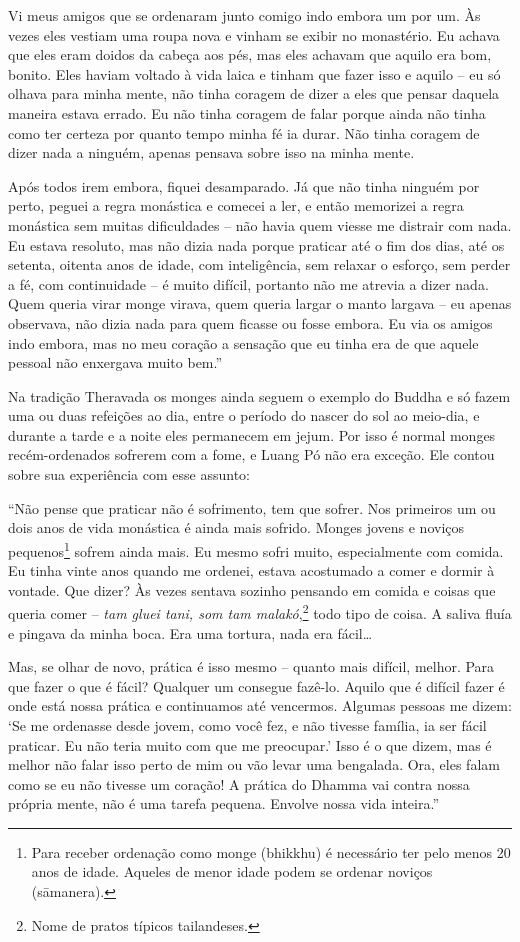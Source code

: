 Vi meus amigos que se ordenaram junto comigo indo embora um por um. Às
vezes eles vestiam uma roupa nova e vinham se exibir no monastério. Eu
achava que eles eram doidos da cabeça aos pés, mas eles achavam que
aquilo era bom, bonito. Eles haviam voltado à vida laica e tinham que
fazer isso e aquilo -- eu só olhava para minha mente, não tinha coragem
de dizer a eles que pensar daquela maneira estava errado. Eu não tinha
coragem de falar porque ainda não tinha como ter certeza por quanto
tempo minha fé ia durar. Não tinha coragem de dizer nada a ninguém,
apenas pensava sobre isso na minha mente.

Após todos irem embora, fiquei desamparado. Já que não tinha ninguém por
perto, peguei a regra monástica e comecei a ler, e então memorizei a
regra monástica sem muitas dificuldades -- não havia quem viesse me
distrair com nada. Eu estava resoluto, mas não dizia nada porque
praticar até o fim dos dias, até os setenta, oitenta anos de idade, com
inteligência, sem relaxar o esforço, sem perder a fé, com continuidade
-- é muito difícil, portanto não me atrevia a dizer nada. Quem queria
virar monge virava, quem queria largar o manto largava -- eu apenas
observava, não dizia nada para quem ficasse ou fosse embora. Eu via os
amigos indo embora, mas no meu coração a sensação que eu tinha era de
que aquele pessoal não enxergava muito bem.''

Na tradição Theravada os monges ainda seguem o exemplo do Buddha e só
fazem uma ou duas refeições ao dia, entre o período do nascer do sol ao
meio-dia, e durante a tarde e a noite eles permanecem em jejum. Por isso
é normal monges recém-ordenados sofrerem com a fome, e Luang Pó não era
exceção. Ele contou sobre sua experiência com esse assunto:

``Não pense que praticar não é sofrimento, tem que sofrer. Nos primeiros
um ou dois anos de vida monástica é ainda mais sofrido. Monges jovens e
noviços pequenos\footnote{Para receber ordenação como monge (bhikkhu) é
  necessário ter pelo menos 20 anos de idade. Aqueles de menor idade
  podem se ordenar noviços (sāmanera).} sofrem ainda mais. Eu mesmo
sofri muito, especialmente com comida. Eu tinha vinte anos quando me
ordenei, estava acostumado a comer e dormir à vontade. Que dizer? Às
vezes sentava sozinho pensando em comida e coisas que queria comer --
\emph{tam gluei tani, som tam malakó},\footnote{Nome de pratos típicos
  tailandeses.} todo tipo de coisa. A saliva fluía e pingava da
minha boca. Era uma tortura, nada era fácil\ldots{}

Mas, se olhar de novo, prática é isso mesmo -- quanto mais difícil,
melhor. Para que fazer o que é fácil? Qualquer um consegue fazê-lo.
Aquilo que é difícil fazer é onde está nossa prática e continuamos até
vencermos. Algumas pessoas me dizem: `Se me ordenasse desde jovem, como
você fez, e não tivesse família, ia ser fácil praticar. Eu não teria
muito com que me preocupar.' Isso é o que dizem, mas é melhor não falar
isso perto de mim ou vão levar uma bengalada. Ora, eles falam como se eu
não tivesse um coração! A prática do Dhamma vai contra nossa própria
mente, não é uma tarefa pequena. Envolve nossa vida inteira.''
